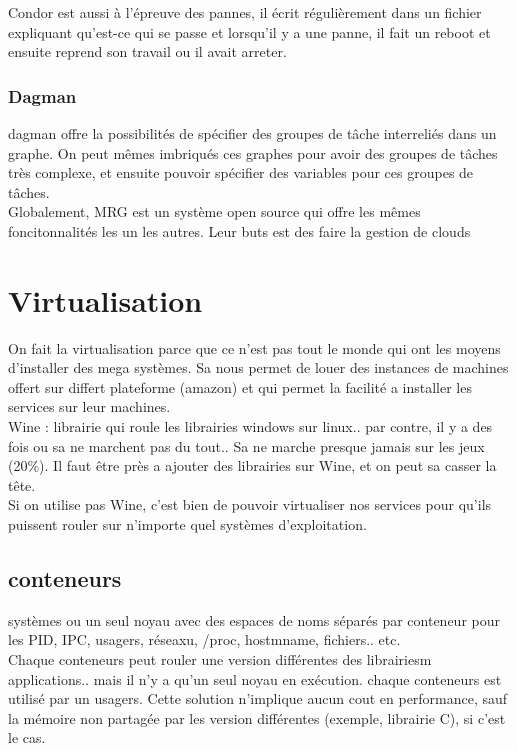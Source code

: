 \documentclass[oneside]{book}
\begin{document}
Condor est aussi à l'épreuve des pannes, il écrit régulièrement dans un fichier expliquant qu'est-ce qui se passe et lorsqu'il y a une panne, il fait un reboot et ensuite reprend son travail ou il avait arreter.\\

\subsubsection{Dagman}
dagman offre la possibilités de spécifier des groupes de tâche interreliés dans un graphe. On peut mêmes imbriqués ces graphes pour avoir des groupes de tâches très complexe, et ensuite pouvoir spécifier des variables pour ces groupes de tâches.\\

Globalement, MRG est un système open source qui offre les mêmes foncitonnalités les un les autres. Leur buts est des faire la gestion de clouds
\section{Virtualisation}
On fait la virtualisation parce que ce n'est pas tout le monde qui ont les moyens d'installer des mega systèmes. Sa nous permet de louer des instances de machines offert sur differt plateforme (amazon) et qui permet la facilité a installer les services sur leur machines.\\

Wine : librairie qui roule les librairies windows sur linux.. par contre, il y a des fois ou sa ne marchent pas du tout.. Sa ne marche presque jamais sur les jeux (20\%). Il faut être près a ajouter des librairies sur Wine, et on peut sa casser la tête.\\

Si on utilise pas Wine, c'est bien de pouvoir virtualiser nos services pour qu'ils puissent rouler sur n'importe quel systèmes d'exploitation.\\

\subsection{conteneurs}
systèmes ou un seul noyau avec des espaces de noms séparés par conteneur pour les PID, IPC, usagers, réseaxu, /proc, hostmname, fichiers.. etc.\\

Chaque conteneurs peut rouler une version différentes des librairiesm applications.. mais il n'y a qu'un seul noyau en exécution. chaque conteneurs est utilisé par un usagers. Cette solution n'implique aucun cout en performance, sauf la mémoire non partagée par les version différentes (exemple, librairie C), si c'est le cas.\\
\end{document}
